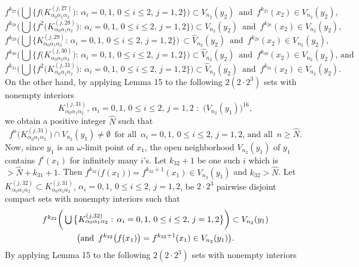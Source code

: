 \documentclass[12pt]{article}
\newcommand{\al}{\alpha}
\begin{document}
$$
f^{k_{27}}\bigg(\bigcup \big\{ f\big(K_{\al_0\al_1\al_2}^{(j,27)}\big): \, \al_i = 0, 1, \, 0 \le i \le 2, \, j = 1, 2 \big\}\bigg) \subset V_{n_2}(y_2) \,\,\, \text{and} \,\,\, f^{k_{27}}(x_2) \in V_{n_2}(y_2), 
$$
$$
f^{k_{28}}\bigg(\bigcup \big\{ f^2\big(K_{\al_0\al_1\al_2}^{(j,28)}\big): \, \al_i = 0, 1, \, 0 \le i \le 2, \, j = 1, 2 \big\}\bigg) \subset V_{n_2}(y_2) \,\,\, \text{and} \,\,\, f^{k_{28}}(x_2) \in V_{n_2}(y_2),
$$
$$
f^{k_{29}}\bigg(\bigcup \big\{ K_{\al_0\al_1\al_2}^{(j,29)}: \, \al_i = 0, 1, \, 0 \le i \le 2, \, j = 1, 2 \big\}\bigg) \, \subset \widehat V_{n_2}(y_2) \,\,\, \text{and} \,\,\, f^{k_{29}}(x_2) \in V_{n_2}(y_2),  
$$
$$
f^{k_{30}}\bigg(\bigcup \big\{ f\big(K_{\al_0\al_1\al_2}^{(j,30)}\big): \, \al_i = 0, 1, \, 0 \le i \le 2, \, j = 1, 2 \big\}\bigg) \subset \widehat V_{n_2}(y_2) \,\,\, \text{and} \,\,\, f^{k_{30}}(x_2) \in V_{n_2}(y_2), \, \text{and}
$$
$$
f^{k_{31}}\bigg(\bigcup \big\{ f^2\big(K_{\al_0\al_1\al_2}^{(j,31)}\big): \, \al_i = 0, 1, \, 0 \le i \le 2, \, j = 1, 2 \big\}\bigg) \subset \widehat V_{n_2}(y_2) \,\,\, \text{and} \,\,\, f^{k_{31}}(x_2) \in V_{n_2}(y_2).
$$
\indent On the other hand, by applying Lemma 15 to the following $2(2 \cdot 2^3)$ sets with nonempty interiors
$$
K_{\al_0\al_1\al_2}^{(j,31)}, \, \al_i = 0, 1, \, 0 \le i \le 2, \, j = 1, 2 \,\, : \,\, \big(V_{n_2}(y_1)\big)^{16},
$$
we obtain a positive integer $\widehat N$ such that 
$$
f^n\big(K_{\al_0\al_1\al_2}^{(j,31)}\big) \cap V_{n_2}(y_1) \ne \emptyset \,\,\, \text{for all} \,\,\, \al_i = 0, 1, \, 0 \le i \le 2, \, j = 1, 2, \, \text{and all} \,\,\, n \ge \widehat N.
$$
\indent Now, since $y_1$ is an $\omega$-limit point of $x_1$, the open neighborhood $V_{n_2}(y_1)$ of $y_1$ contains $f^i(x_1)$ for infinitely many $i$'s.  Let $k_{32}+1$ be one such $i$ which is $> \widehat N+k_{31}+1$.  Then $f^{k_{32}}\big(f(x_1)\big) = f^{k_{32}+1}(x_1) \in V_{n_2}(y_1)$ and $k_{32} > \widehat N$.  Let $K_{\al_0\al_1\al_2}^{(j,32)} \subset K_{\al_0\al_1\al_2}^{(j,31)}$, $\al_i = 0, 1$, $0 \le i \le 2$, $j = 1, 2$, be $2 \cdot 2^3$ pairwise disjoint compact sets with nonempty interiors such that 
\begin{multline*}
$$
f^{k_{32}}\bigg(\bigcup \big\{ K_{\al_0\al_1\al_2}^{(j,32)}: \, \al_i = 0, 1, \, 0 \le i \le 2, \, j = 1, 2 \big\}\bigg) \subset V_{n_2}(y_1) \\ \big(\text{and} \,\,\, f^{k_{32}}\big(f(x_1)\big) = f^{k_{32}+1}(x_1) \in V_{n_2}(y_1)\big).
$$
\end{multline*}
\indent By applying Lemma 15 to the following $2(2 \cdot 2^3)$ sets with nonempty interiors 
\end{document}
